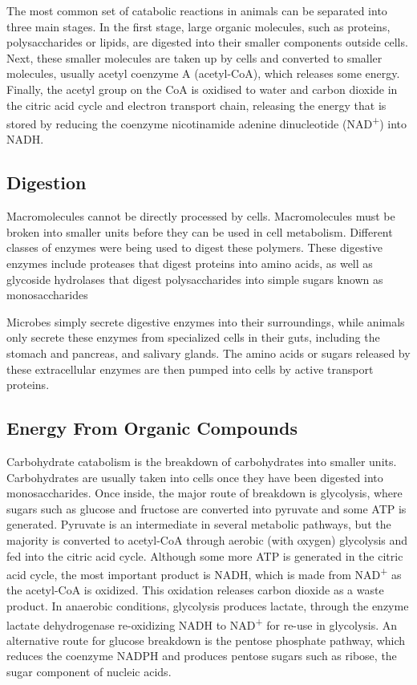 The most common set of catabolic reactions in animals can be separated into three main stages. In the first stage, large organic molecules, such as proteins, polysaccharides or lipids, are digested into their smaller components outside cells. Next, these smaller molecules are taken up by cells and converted to smaller molecules, usually acetyl coenzyme A (acetyl-CoA), which releases some energy. Finally, the acetyl group on the CoA is oxidised to water and carbon dioxide in the citric acid cycle and electron transport chain, releasing the energy that is stored by reducing the coenzyme nicotinamide adenine dinucleotide (NAD\textsuperscript{+}) into NADH.

\hypertarget{digestion}{%
\subsection{Digestion}\label{digestion}}

Macromolecules cannot be directly processed by cells. Macromolecules must be broken into smaller units before they can be used in cell metabolism. Different classes of enzymes were being used to digest these polymers. These digestive enzymes include proteases that digest proteins into amino acids, as well as glycoside hydrolases that digest polysaccharides into simple sugars known as monosaccharides

Microbes simply secrete digestive enzymes into their surroundings, while animals only secrete these enzymes from specialized cells in their guts, including the stomach and pancreas, and salivary glands. The amino acids or sugars released by these extracellular enzymes are then pumped into cells by active transport proteins.

\hypertarget{energy-from-organic-compounds}{%
\subsection{Energy From Organic Compounds}\label{energy-from-organic-compounds}}

Carbohydrate catabolism is the breakdown of carbohydrates into smaller units. Carbohydrates are usually taken into cells once they have been digested into monosaccharides. Once inside, the major route of breakdown is glycolysis, where sugars such as glucose and fructose are converted into pyruvate and some ATP is generated. Pyruvate is an intermediate in several metabolic pathways, but the majority is converted to acetyl-CoA through aerobic (with oxygen) glycolysis and fed into the citric acid cycle. Although some more ATP is generated in the citric acid cycle, the most important product is NADH, which is made from NAD\textsuperscript{+} as the acetyl-CoA is oxidized. This oxidation releases carbon dioxide as a waste product. In anaerobic conditions, glycolysis produces lactate, through the enzyme lactate dehydrogenase re-oxidizing NADH to NAD\textsuperscript{+} for re-use in glycolysis. An alternative route for glucose breakdown is the pentose phosphate pathway, which reduces the coenzyme NADPH and produces pentose sugars such as ribose, the sugar component of nucleic acids.


